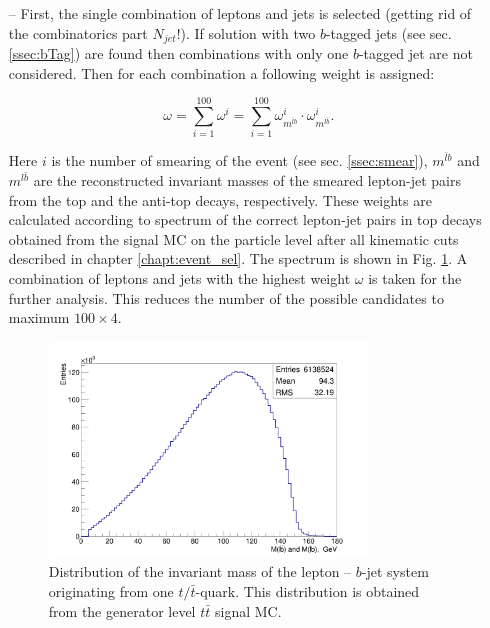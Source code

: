 \begin{itemize}

 \item [--] First, the single combination of leptons and jets is selected (getting rid of the combinatorics part $N_{jet}!$). If solution with 
 two $b$-tagged jets (see sec. \ref{ssec:bTag}) are found then combinations with only one $b$-tagged jet are not considered. Then for each 
 combination a following weight is assigned:
 
 \begin{equation}\label{eq:mblw}
  \omega = \sum_{i=1}^{100} \omega^{i} = \sum_{i=1}^{100} \omega^{i}_{m^{\bar{l}b}} \cdot \omega^{i}_{m^{l\bar{b}}}.
 \end{equation}

 Here $i$ is the number of smearing of the event (see sec. \ref{ssec:smear}), $m^{\bar{l}b}$ and $m^{l\bar{b}}$ are the reconstructed 
 invariant masses of the smeared lepton-jet pairs from the top and the anti-top decays, respectively. These weights are calculated 
 according to spectrum of the correct lepton-jet pairs in top decays obtained from the signal MC on the particle level after all kinematic 
 cuts described in chapter \ref{chapt:event_sel}. The spectrum is shown in Fig. \ref{fig:mlb}. A combination of leptons and jets with 
 the highest weight $\omega$ is taken for the further analysis. This reduces the number of the possible candidates to maximum $100 \times 4$.
 
 \begin{figure}[t]
  \centering
  \includegraphics[width=0.8\textwidth]{05_kinReco/plots/mlb_distr.png}
  \caption{Distribution of the invariant mass of the lepton -- $b$-jet system originating from one $t/\bar{t}$-quark. This distribution is obtained from the
  generator level $t\bar{t}$ signal MC.}
  \label{fig:mlb}
 \end{figure}
 

\end{itemize}
